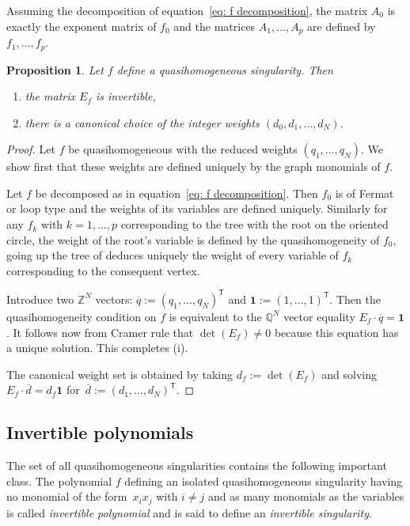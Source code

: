 \documentclass[pdftex]{sigma}
\numberwithin{equation}{section}
\newtheorem{Proposition}[Theorem]{Proposition}
 { \theoremstyle{definition}
\newtheorem{Definition}[Theorem]{Definition}
\newtheorem{Note}[Theorem]{Note}
\newtheorem{Example}[Theorem]{Example}
\newtheorem{Remark}[Theorem]{Remark} }
\newcommand{\QQ}{{\mathbb{Q}}}
\newcommand{\ZZ}{{\mathbb{Z}}}
\begin{document}
Assuming the decomposition of equation~\eqref{eq: f decomposition}, the matrix $A_0$ is exactly the exponent matrix of $f_0$ and the matrices $A_1,\dots,A_p$ are defined by $f_1,\dots,f_p$.

\begin{Proposition}\label{prop: graph exponent matrix is invertible}
	Let $f$ define a quasihomogeneous singularity. Then
	\begin{enumerate}\itemsep=0pt
	 \item[$(i)$] the matrix $E_f$ is invertible,
	 \item[$(ii)$] there is a canonical choice of the integer weights $(d_0,d_1,\dots,d_N)$.
	\end{enumerate}
\end{Proposition}
\begin{proof}
	Let $f$ be quasihomogeneous with the reduced weights $(q_1,\dots,q_N)$. We show first that these weights are defined uniquely by the graph monomials of $f$.


 Let $f$ be decomposed as in equation~\eqref{eq: f decomposition}. Then $f_0$ is of Fermat or loop type and the weights of its variables are defined uniquely. Similarly for any $f_k$ with $k=1,\dots,p$ corresponding to the tree with the root on the oriented circle, the weight of the root's variable is defined by the quasihomogeneity of $f_0$, going up the tree of deduces uniquely the weight of every variable of $f_k$ corresponding to the consequent vertex.

 Introduce two $\ZZ^N$ vectors: $\overline{q} := (q_1,\dots,q_N)^{\mathsf{T}}$ and $\boldsymbol{1} := (1,\dots,1)^{\mathsf{T}}$. Then the quasihomogeneity condition on $f$ is equivalent to the $\QQ^N$ vector equality $E_f \cdot \overline{q} = \boldsymbol{1}$. It follows now from Cramer rule that $\det(E_f) \neq 0$ because this equation has a unique solution. This completes (i).

	The canonical weight set is obtained by taking $d_f := \det(E_f)$ and solving $E_f \cdot \overline{d} = d_f \boldsymbol{1}$ for~$\overline{d} := (d_1,\dots,d_N)^{\mathsf{T}}$.
\end{proof}

\subsection{Invertible polynomials}\label{sec: invertible polynomials}

The set of all quasihomogeneous singularities contains the following important class. The polynomial $f$ defining an isolated quasihomogeneous singularity having no monomial of the form~$x_ix_j$ with $i\ne j$ and as many monomials as the variables is called \textit{invertible polynomial} and is said to define an \textit{invertible singularity}.
\end{document}
